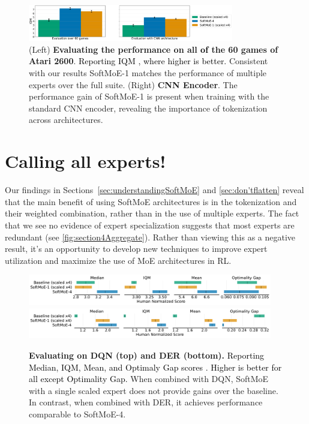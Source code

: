 \documentclass{article} %
\newcommand{\rebuttal}[1]{\textcolor{black}{#1}}
\begin{document}
\begin{figure}[!t]
    \centering
        \includegraphics[width=0.8\textwidth]{figures/results/60games_and_CNN_joint_bar_plot.pdf}
    \caption{(Left) \textbf{Evaluating the performance on all \rebuttal{of} the 60 games of Atari 2600}. \rebuttal{Reporting IQM \citep{agarwal2021deep}, where higher is better.} Consistent with our results SoftMoE-1 matches the performance of multiple experts over the full suite. (Right) \textbf{CNN Encoder}. The performance gain of SoftMoE-1 is present when training with the standard CNN encoder, revealing the importance of tokenization across architectures. }
    \label{fig:CNNEncoder_60games}
    \vspace{-0.2cm}
\end{figure}

\section{Calling all experts!}
\label{sec:expertutilization}
Our findings in Sections~\ref{sec:understandingSoftMoE} and \ref{sec:don'tflatten} reveal that the main benefit of using SoftMoE architectures is in the tokenization and their weighted combination, rather than in the use of multiple experts. The fact that we see no evidence of expert specialization suggests that most experts are redundant (see \autoref{fig:section4Aggregate}). Rather than viewing this as a negative result, it's an opportunity to develop
new techniques to improve expert utilization and maximize the use of MoE architectures in RL.

\begin{figure}[!b]
    \centering
    \includegraphics[width=0.95\textwidth]{figures/results/SoftMoE-4_DQN_IntEstimates.pdf}
    \includegraphics[width=0.95\textwidth]{figures/results/SoftMoE-4_DER_IntEstimates.pdf}
    \caption{\textbf{Evaluating on DQN (top) and DER (bottom).} \rebuttal{Reporting Median, IQM, Mean, and Optimaly Gap scores \citep{agarwal2021deep}. Higher is better for all except Optimality Gap.} When combined with DQN, SoftMoE with a single scaled expert does not provide gains over the baseline. In contrast, when combined with DER, it achieves performance comparable to SoftMoE-4.}
    \label{fig:differentagentsDERDQN}
    \vspace{-0.2cm}
\end{figure}
\end{document}
